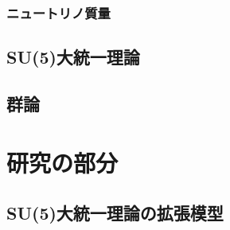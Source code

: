 \documentclass[uplatex,dvipdfmx,a4paper,titlepage]{jsbook}
\theoremstyle{plain}
\theoremstyle{definition}
\begin{document}
\section{ニュートリノ質量}


\chapter{SU(5)大統一理論}


\chapter{群論}



\part{研究の部分}

\chapter{SU(5)大統一理論の拡張模型}



\end{document}
